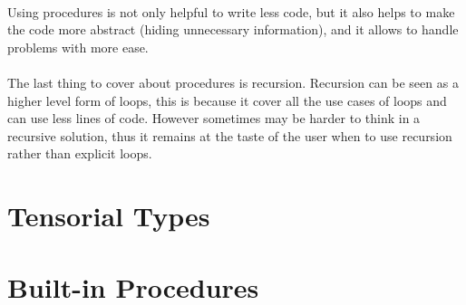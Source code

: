 \paragraph{} Using procedures is not only helpful to write less code, but it
also helps to make the code more abstract (hiding unnecessary information), and
it allows to handle problems with more ease.

\newpage

\paragraph{} The last thing to cover about procedures is recursion. Recursion
can be seen as a higher level form of loops, this is because it cover all the
use cases of loops and can use less lines of code. However sometimes may be
harder to think in a recursive solution, thus it remains at the taste of the
user when to use recursion rather than explicit loops.

\section{Tensorial Types}

\section{Built-in Procedures}
